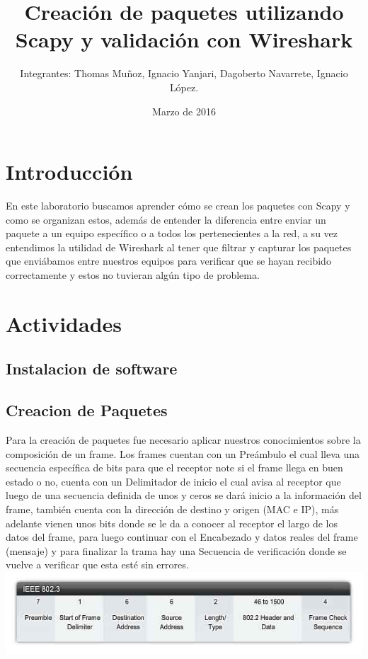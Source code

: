 \documentclass{udpreport}
\title{Creación de paquetes utilizando Scapy y validación con Wireshark}
\author{Integrantes: Thomas Muñoz, Ignacio Yanjari, Dagoberto Navarrete, Ignacio López.}
\date{Marzo de 2016}
\begin{document}
\maketitle
\tableofcontents
\chapter{Introducción}
	En este laboratorio buscamos aprender cómo se crean los paquetes con Scapy y como se organizan estos, además de entender la
	diferencia entre enviar un paquete a un equipo específico o a todos los pertenecientes a la red, a su vez entendimos la
	utilidad de Wireshark al tener que filtrar y capturar los paquetes que enviábamos entre nuestros equipos para verificar que se
	hayan recibido correctamente y estos no tuvieran algún tipo de problema.
\chapter{Actividades}
	\section{Instalacion de software}

	\section{Creacion de Paquetes}
		Para la creación de paquetes fue necesario aplicar nuestros conocimientos sobre la composición de un frame.
		Los frames cuentan con un Preámbulo el cual lleva una secuencia específica de bits para que el receptor note si el
		frame llega en buen estado o no, cuenta con un Delimitador de inicio el cual avisa al receptor que luego de una
		secuencia definida de unos y ceros se dará inicio a la información del frame, también cuenta con la dirección de
		destino y origen (MAC e IP), más adelante vienen unos bits donde se le da a conocer al receptor el largo de los datos
		del frame, para luego continuar con el Encabezado y datos reales del frame (mensaje) y para finalizar la trama hay una
		Secuencia de verificación donde se vuelve a verificar que esta esté sin errores.\\
		
		\includegraphics[width=\textwidth]{frame.jpg}
\end{document}
